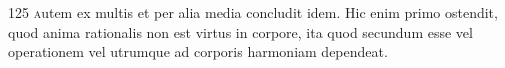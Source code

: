\lettrine{125 }
autem ex multis et per alia media concludit idem. Hic enim primo ostendit, quod anima rationalis 
non est virtus in corpore, ita quod secundum esse vel
operationem vel utrumque ad corporis harmoniam dependeat.


\blEndBook

